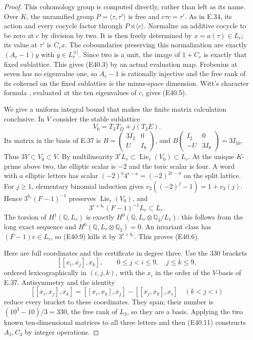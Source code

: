 \begin{proof}
This cohomology group is computed directly, rather
than left as its name. Over $K$, the unramified group
$P=\langle\tau,\tau'\rangle$ is free and
$c\tau c=\tau'$. As in E.34, its action and every
cocycle factor through $P\rtimes\langle c\rangle$.
Normalize an additive cocycle to be zero at $c$ by
division by two. It is then freely determined by
$x=a(\tau)\in L_r$; its value at $\tau'$ is $C_rx$.
The coboundaries preserving this normalization are
exactly $(A_r-1)y$ with $y\in L_r^{\langle c\rangle}$.
Since two is a unit, the image of $1+C_r$ is exactly
that fixed sublattice. This gives (E40.3) by an actual
evaluation map. Frobenius at seven has no eigenvalue
one, so $A_r-1$ is rationally injective and the free
rank of its cokernel on the fixed sublattice is the
minus-space dimension. Witt's character formula
\cite[Theorem A.1]{E_AkaWitt}, evaluated at the ten
eigenvalues of $c$, gives (E40.5).

We give a uniform integral bound that makes the
finite matrix calculation conclusive. In $V$ consider
the stable sublattice
\[
 V_0=T_3T_D+j(T_3E).
 \tag{E40.8}
\]
Its matrix in the basis of E.37 is
$B=\left(\begin{smallmatrix}3I_2&0\\U&I_8\end{smallmatrix}\right)$,
and
$B\left(\begin{smallmatrix}I_2&0\\-U&3I_8\end{smallmatrix}\right)=3I_{10}$.
Thus $3V\subset V_0\subset V$. By multilinearity
$3^rL_r\subset\operatorname{Lie}_r(V_0)\subset L_r$.
At the unique $K$-prime above two, the elliptic scalar
is $-2$ and the toric scalar is four. A word with
$a$ elliptic letters has scalar
$(-2)^a4^{r-a}=(-2)^{2r-a}$ on the split lattice.
For $j\ge1$, elementary binomial induction gives
$v_3((-2)^j-1)=1+v_3(j)$. Hence $3^{b_r}(F-1)^{-1}$
preserves $\operatorname{Lie}_r(V_0)$, and
\[
 3^{r+b_r}(F-1)^{-1}L_r\subset L_r.
 \tag{E40.9}
\]
The torsion of $H^1(\mathbb Q,L_r)$ is exactly
$H^0(\mathbb Q,L_r\otimes\mathbb Q_3/L_r)$:
this follows from the long exact sequence and
$H^0(\mathbb Q,L_r\otimes\mathbb Q_3)=0$.
An invariant class has $(F-1)v\in L_r$, so (E40.9)
kills it by $3^{r+b_r}$. This proves (E40.6).

Here are full coordinates and the certificate in
degree three. Use the $330$ brackets
\[
 [[x_i,x_j],x_k],\qquad
 0\le j<i\le9,\quad j\le k\le9,
 \tag{E40.10}
\]
ordered lexicographically in $(i,j,k)$, with the $x_i$
in the order of the $V$-basis of E.37. Antisymmetry
and the identity
\[
 [[x_i,x_j],x_k]
   =[[x_i,x_k],x_j]-[[x_j,x_k],x_i]
       \quad(k<j<i)
 \tag{E40.11}
\]
reduce every bracket to these coordinates. They
span; their number is $(10^3-10)/3=330$, the free
rank of $L_3$, so they are a basis. Applying the
two known ten-dimensional matrices to all three
letters and then (E40.11) constructs $A_3,C_3$
by integer operations.


\end{proof}
